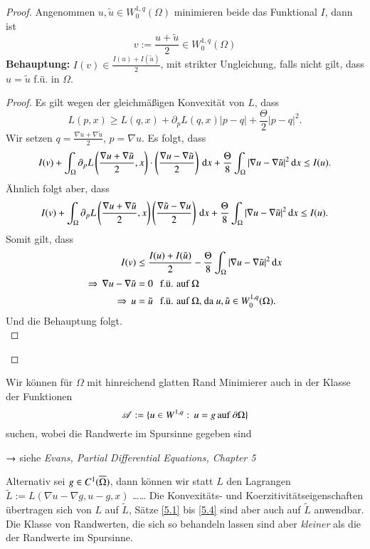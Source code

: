 \begin{proof}
    Angenommen $u,\tilde u \in W_0^{1,q}(\Omega)$ minimieren beide das Funktional $I$, dann ist
    \[
        v:=\frac{u+\tilde u}2 \in W_0^{1,q}(\Omega)
    \]
    \textbf{Behauptung:} $I(v)\in \frac{I(u)+ I(\tilde u)}{2}$, mit strikter Ungleichung, falls nicht gilt,
    dass $u=\tilde u$ f.ü. in $\Omega$.
    \begin{proof}
    Es gilt wegen der gleichmäßigen Konvexität von $L$, dass
    \[
        L(p,x)\geq L(q,x) + \partial _p L(q,x)|p-q|+ \frac\Theta2 |p-q|^2.
    \]
    Wir setzen $q=\frac{\nabla u + \nabla \tilde u}2$, $p=\nabla u$. Es folgt, dass
    \[
        I(v) + \int_\Omega \partial _pL\left(\frac{\nabla u + \nabla \tilde u}2, x\right)\cdot \left( 
        \frac{\nabla u-\nabla \tilde u}2\right) \, \mathrm{d} x + \frac\Theta8 \int_\Omega |\nabla u - \nabla \tilde u|^2
        \, \mathrm{d} x\leq I(u).
    \]
    Ähnlich folgt aber, dass
    \[
        I(v)+\int_\Omega \partial _p L\left( \frac{\nabla u + \nabla \tilde u}2, x \right) \left( \frac{\nabla \tilde u
        -\nabla u}2\right) \, \mathrm{d} x +\frac\Theta8\int_\Omega|\nabla u - \nabla \tilde u|^2 \, \mathrm{d} x \leq I(u).
    \]
    Somit gilt, dass
    \begin{align*}
        I(v)&\leq \frac{I(u)+I(\tilde u)}2 -\frac\Theta8 \int_\Omega |\nabla u-\nabla \tilde u|^2 \, \mathrm{d} x\\
        \Rightarrow \, \nabla u - \nabla \tilde u &= 0 \hspace{.25cm} \text{f.ü. auf }\Omega\\
        \Rightarrow \, u&=\tilde u \hspace{.25cm} \text{f.ü. auf $\Omega$, da $u,\tilde u\in W_0^{1,q}(\Omega)$}.
    \end{align*}
    Und die Behauptung folgt. \[ \]
    \end{proof}
    \[ \]
\end{proof}
Wir können für $\Omega$ mit hinreichend glatten Rand Minimierer auch in der Klasse der Funktionen
\[
    \mathscr A:= \{u\in W^{1,q}:\, u=g \, \text{auf } \partial \Omega\}
\]
suchen, wobei die Randwerte im Spursinne gegeben sind

\noindent $\rightarrow$ siehe \textit{Evans, Partial Differential Equations, Chapter 5}

\noindent Alternativ sei $g\in C^1(\overline \Omega)$, dann können wir statt $L$ den Lagrangen
$\tilde L:= L(\nabla u-\nabla g,u-g,x)$
……
Die Konvexitäts- und Koerzitivitätseigenschaften übertragen sich von $L$ auf $\tilde L$, Sätze \ref{5.1}
bis \ref{5.4} sind aber auch auf $\tilde L$ anwendbar.
Die Klasse von Randwerten, die sich so behandeln lassen sind aber \textit{kleiner} als die der Randwerte
im Spursinne.

